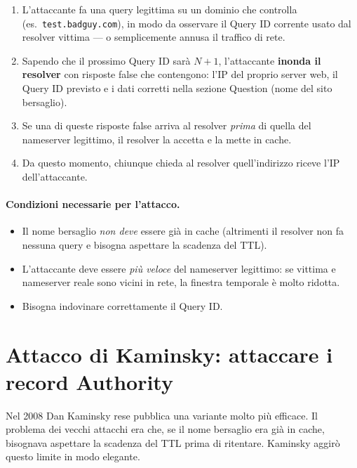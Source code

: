 \documentclass{article}
\begin{document}
\begin{enumerate}[label=\Circled{\arabic*}]
    \item L'attaccante fa una query legittima su un dominio che controlla
        (es.\ \texttt{test.badguy.com}), in modo da osservare il Query ID
        corrente usato dal resolver vittima --- o semplicemente annusa il
        traffico di rete.

    \item Sapendo che il prossimo Query ID sarà $N{+}1$, l'attaccante
        \textbf{inonda il resolver} con risposte false che contengono:
        l'IP del proprio server web, il Query ID previsto e i dati corretti
        nella sezione Question (nome del sito bersaglio).

    \item Se una di queste risposte false arriva al resolver
        \emph{prima} di quella del nameserver legittimo, il resolver la
        accetta e la mette in cache.

    \item Da questo momento, chiunque chieda al resolver quell'indirizzo
        riceve l'IP dell'attaccante.
\end{enumerate}

\paragraph{Condizioni necessarie per l'attacco.}
\begin{itemize}
    \item Il nome bersaglio \emph{non deve} essere già in cache (altrimenti
        il resolver non fa nessuna query e bisogna aspettare la scadenza del
        TTL).
    \item L'attaccante deve essere \emph{più veloce} del nameserver legittimo:
        se vittima e nameserver reale sono vicini in rete, la finestra
        temporale è molto ridotta.
    \item Bisogna indovinare correttamente il Query ID.
\end{itemize}


\section*{Attacco di Kaminsky: attaccare i record Authority}

Nel 2008 Dan Kaminsky rese pubblica una variante molto più efficace. Il
problema dei vecchi attacchi era che, se il nome bersaglio era già in cache,
bisognava aspettare la scadenza del TTL prima di ritentare. Kaminsky aggirò
questo limite in modo elegante.
\end{document}
